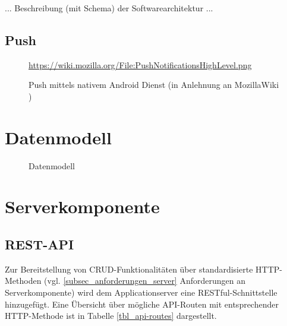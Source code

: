 ... Beschreibung (mit Schema) der Softwarearchitektur ...

\newpage
\subsection{Push}

\begin{figure}[htp] 
\caption{Push mittels nativem Android Dienst (in Anlehnung an MozillaWiki \cite{MOZ_WIKI})}
\quelle\url{https://wiki.mozilla.org/File:PushNotificationsHighLevel.png}
\label{image_architektur-android-push}
\end{figure}  

\section{Datenmodell}
\label{subsec_datenmodell}

\begin{figure}[htp] 
\caption{Datenmodell}
\label{image_konzeption_datenmodell}
\end{figure} 


\section{Serverkomponente}
\label{subsec_serverkomponente}

\subsection{REST-API}

Zur Bereitstellung von CRUD-Funktionalitäten über standardisierte HTTP-Methoden (vgl. \ref{subsec_anforderungen_server} Anforderungen an Serverkomponente) wird dem Applicationserver eine RESTful-Schnittstelle hinzugefügt. Eine Übersicht über mögliche API-Routen mit entsprechender HTTP-Methode ist in Tabelle \ref{tbl_api-routes} dargestellt. \\

